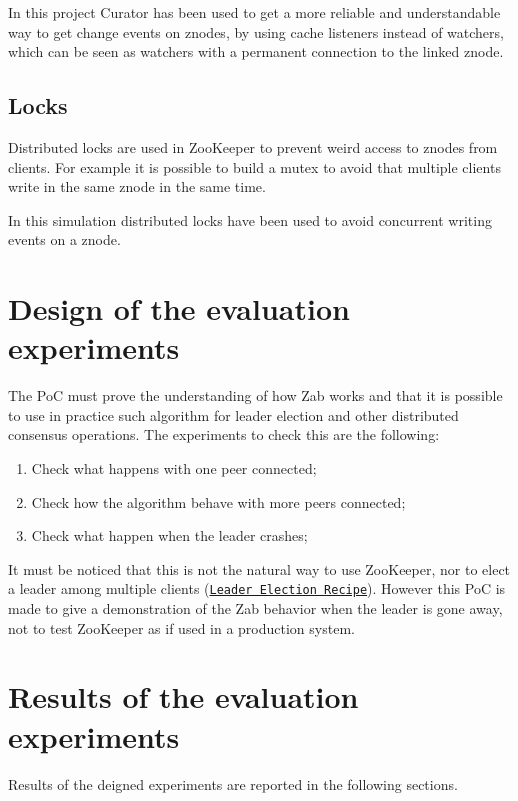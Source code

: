 In this project Curator has been used to get a more reliable and understandable way to get change events on znodes, by using cache listeners instead of watchers, which can be seen as watchers with a permanent connection to the linked znode.

\subsection{Locks\label{sec:locks}}
Distributed locks are used in ZooKeeper to prevent weird access to znodes from clients.
For example it is possible to build a mutex to avoid that multiple clients write in the same znode in the same time.

In this simulation distributed locks have been used to avoid concurrent writing events on a znode.

\section{Design of the evaluation experiments\label{sec:evaluation}}

The PoC must prove the understanding of how Zab works and that it is possible to use in practice such algorithm for leader election and other distributed consensus operations.
The experiments to check this are the following:
\begin{enumerate}
    \item Check what happens with one peer connected;
    \item Check how the algorithm behave with more peers connected;
    \item Check what happen when the leader crashes;
\end{enumerate}

It must be noticed that this is not the natural way to use ZooKeeper, nor to elect a leader among multiple clients (\href{https://curator.apache.org/curator-recipes/leader-election.html}{\texttt{Leader Election Recipe}}). However this PoC is made to give a demonstration of the Zab behavior when the leader is gone away, not to test ZooKeeper as if used in a production system.

\clearpage

\section{Results of the evaluation experiments\label{sec:results}}

Results of the deigned experiments are reported in the following sections.

